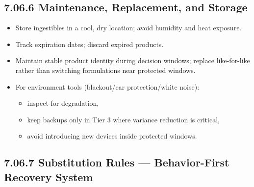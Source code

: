 \documentclass[10pt]{article}
\begin{document}
\subsection*{7.06.6 Maintenance, Replacement, and Storage}
{}

\begin{itemize}
\item Store ingestibles in a cool, dry location; avoid humidity and heat exposure.
\item Track expiration dates; discard expired products.
\item Maintain stable product identity during decision windows; replace like-for-like rather than switching formulations near protected windows.
\item For environment tools (blackout/ear protection/white noise):
  \begin{itemize}
  \item inspect for degradation,
  \item keep backups only in Tier 3 where variance reduction is critical,
  \item avoid introducing new devices inside protected windows.
  \end{itemize}
\end{itemize}

\subsection*{7.06.7 Substitution Rules — Behavior-First Recovery System}
{}
\end{document}
